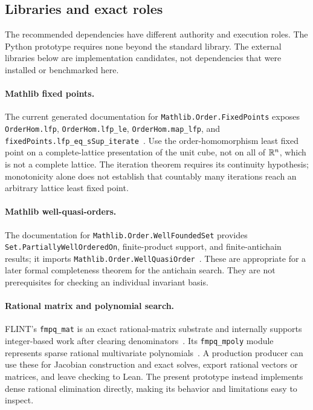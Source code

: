 \documentclass[11pt,a4paper]{article}
\theoremstyle{definition}\newtheorem{definition}[theorem]{Definition}
\theoremstyle{remark}\newtheorem{remark}[theorem]{Remark}
\newcommand{\code}[1]{\nolinkurl{#1}}
\begin{document}
\subsection{Libraries and exact roles}
The recommended dependencies have different authority and execution roles. The Python prototype requires none beyond the standard library. The external libraries below are implementation candidates, not dependencies that were installed or benchmarked here.

\paragraph{Mathlib fixed points.}
The current generated documentation for \code{Mathlib.Order.FixedPoints} exposes \code{OrderHom.lfp}, \code{OrderHom.lfp_le}, \code{OrderHom.map_lfp}, and \code{fixedPoints.lfp_eq_sSup_iterate}~\cite{mathlib-fixed}. Use the order-homomorphism least fixed point on a complete-lattice presentation of the unit cube, not on all of $\mathbb R^n$, which is not a complete lattice. The iteration theorem requires its continuity hypothesis; monotonicity alone does not establish that countably many iterations reach an arbitrary lattice least fixed point.

\paragraph{Mathlib well-quasi-orders.}
The documentation for \code{Mathlib.Order.WellFoundedSet} provides \code{Set.PartiallyWellOrderedOn}, finite-product support, and finite-antichain results; it imports \code{Mathlib.Order.WellQuasiOrder}~\cite{mathlib-wqo}. These are appropriate for a later formal completeness theorem for the antichain search. They are not prerequisites for checking an individual invariant basis.

\paragraph{Rational matrix and polynomial search.}
FLINT's \code{fmpq_mat} is an exact rational-matrix substrate and internally supports integer-based work after clearing denominators~\cite{flint-matrix}. Its \code{fmpq_mpoly} module represents sparse rational multivariate polynomials~\cite{flint-mpoly}. A production producer can use these for Jacobian construction and exact solves, export rational vectors or matrices, and leave checking to Lean. The present prototype instead implements dense rational elimination directly, making its behavior and limitations easy to inspect.
\end{document}
